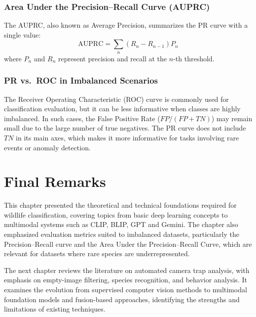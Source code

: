 \subsubsection{Area Under the Precision–Recall Curve (AUPRC)}

The AUPRC, also known as Average Precision, summarizes the PR curve with a single value:
\begin{equation}
\text{AUPRC} = \sum_{n} (R_n - R_{n-1}) P_n
\end{equation}
where $P_n$ and $R_n$ represent precision and recall at the $n$-th threshold.

\subsubsection{PR vs.\ ROC in Imbalanced Scenarios}

The Receiver Operating Characteristic (ROC) curve is commonly used for classification evaluation, but it can be less informative when classes are highly imbalanced. In such cases, the False Positive Rate ($FP/(FP+TN)$) may remain small due to the large number of true negatives. The PR curve does not include $TN$ in its main axes, which makes it more informative for tasks involving rare events or anomaly detection.

\section{Final Remarks}

This chapter presented the theoretical and technical foundations required for wildlife classification, covering topics from basic deep learning concepts to multimodal systems such as CLIP, BLIP, GPT and Gemini. The chapter also emphasized evaluation metrics suited to imbalanced datasets, particularly the Precision–Recall curve and the Area Under the Precision–Recall Curve, which are relevant for datasets where rare species are underrepresented.

The next chapter reviews the literature on automated camera trap analysis, with emphasis on empty-image filtering, species recognition, and behavior analysis. It examines the evolution from supervised computer vision methods to multimodal foundation models and fusion-based approaches, identifying the strengths and limitations of existing techniques.